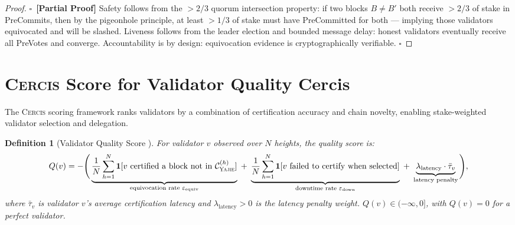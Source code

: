 \documentclass[11pt,a4paper]{article}
\newtheorem{definition}[theorem]{Definition}
\theoremstyle{definition}
\newcommand{\rigorPartial}[0]{$\square$~\textbf{[Partial Proof]}}
\newcommand{\Yajie}{\textsc{Yajie}}
\newcommand{\Cercis}{\textsc{Cercis}}
\newcommand{\ind}[1]{\mathbf{1}[#1]}
\begin{document}
\begin{proof}\rigorPartial
Safety follows from the $>2/3$ quorum intersection property: if two blocks $B \neq B'$ both receive $>2/3$ of stake in PreCommits, then by the pigeonhole principle, at least $>1/3$ of stake must have PreCommitted for both — implying those validators equivocated and will be slashed. Liveness follows from the leader election and bounded message delay: honest validators eventually receive all PreVotes and converge. Accountability is by design: equivocation evidence is cryptographically verifiable. $\square$
\end{proof}
\section{\Cercis{} Score for Validator Quality Cercis}
\label{sec:cercis}
The \Cercis{} scoring framework ranks validators by a combination of certification accuracy and chain novelty, enabling stake-weighted validator selection and delegation.
\begin{definition}[Validator Quality Score ]
\label{def:validator_Q}
For validator $v$ observed over $N$ heights, the quality score is:
\begin{equation}
    Q(v) = -\Bigg(
        \underbrace{\frac{1}{N} \sum_{h=1}^{N} \ind{v \text{ certified a block not in } \mathcal{C}_{\Yajie}^{(h)}}}_{\text{equivocation rate } \varepsilon_{\mathrm{equiv}}}
        \;+\;
        \underbrace{\frac{1}{N} \sum_{h=1}^{N} \ind{v \text{ failed to certify when selected}}}_{\text{downtime rate } \varepsilon_{\mathrm{down}}}
        \;+\;
        \underbrace{\lambda_{\mathrm{latency}} \cdot \bar{\tau}_v}_{\text{latency penalty}}
    \Bigg),
    \label{eq:validator_Q}
\end{equation}
where $\bar{\tau}_v$ is validator $v$'s average certification latency and $\lambda_{\mathrm{latency}} > 0$ is the latency penalty weight. $Q(v) \in (-\infty, 0]$, with $Q(v) = 0$ for a perfect validator.
\end{definition}
\end{document}
